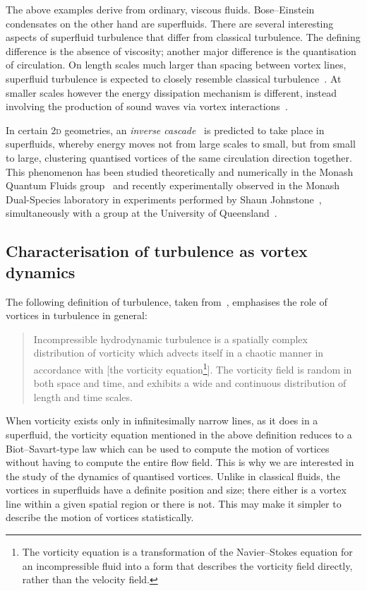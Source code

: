 The above examples derive from ordinary, viscous fluids. Bose--Einstein condensates on the other hand are superfluids. There are several interesting aspects of superfluid turbulence that differ from classical turbulence. The defining difference is the absence of viscosity; another major difference is the quantisation of circulation. On length scales much larger than spacing between vortex lines, superfluid turbulence is expected to closely resemble classical turbulence~\cite{tsubota_energy_2009}. At smaller scales however the energy dissipation mechanism is different, instead involving the production of sound waves via vortex interactions~\cite{tsubota_energy_2009, vinen_how_2005}.

In certain 2\textsc{d} geometries, an \emph{inverse cascade}~\cite{onsager_statistical_1949, kraichnan_inertial_1967} is predicted to take place in superfluids, whereby energy moves not from large scales to small, but from small to large, clustering quantised vortices of the same circulation direction together. This phenomenon has been studied theoretically and numerically in the Monash Quantum Fluids group~\cite{simula_emergence_2014, groszek_vortex_2018} and recently experimentally observed in the Monash Dual-Species laboratory in experiments performed by Shaun Johnstone~\cite{johnstone_order_2018}, simultaneously with a group at the University of Queensland~\cite{gauthier_negative-temperature_2018}.

\subsection{Characterisation of turbulence as vortex dynamics}

The following definition of turbulence, taken from~\cite[p 53]{davidson_turbulence:_2004}, emphasises the role of vortices in turbulence in general:
\begin{quote}
Incompressible hydrodynamic turbulence is a spatially complex distribution of vorticity which advects itself in a chaotic manner in accordance with [the vorticity equation\footnote{The vorticity equation is a transformation of the Navier--Stokes equation for an incompressible fluid into a form that describes the vorticity field directly, rather than the velocity field.}]. The vorticity field is random in both space and time, and exhibits a wide and continuous distribution of length and time scales.
\end{quote}

When vorticity exists only in infinitesimally narrow lines, as it does in a superfluid, the vorticity equation mentioned in the above definition reduces to a Biot--Savart-type law which can be used to compute the motion of vortices without having to compute the entire flow field. This is why we are interested in the study of the dynamics of quantised vortices. Unlike in classical fluids, the vortices in superfluids have a definite position and size; there either is a vortex line within a given spatial region or there is not. This may make it simpler to describe the motion of vortices statistically.

